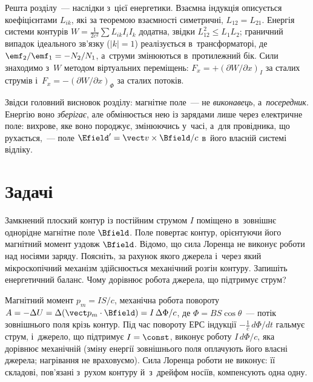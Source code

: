 Решта розділу~--- наслідки з~цієї енергетики. Взаємна індукція описується коефіцієнтами $L_{ik}$, які за теоремою взаємності симетричні, $L_{12}=L_{21}$. Енергія системи контурів $W=\frac1{2c^2}\sum L_{ik}I_iI_k$ додатна, звідки $L_{12}^2\le L_1L_2$; граничний випадок ідеального зв'язку ($|k|=1$) реалізується в~трансформаторі, де $\emf_2/\emf_1=-N_2/N_1$, а~струми змінюються в~протилежний бік. Сили знаходимо з~$W$ методом віртуальних переміщень: $F_x=+(\partial W/\partial x)_I$ за сталих струмів і~$F_x=-(\partial W/\partial x)_\Phi$ за сталих потоків.

Звідси головний висновок розділу: магнітне поле~--- не \emph{виконавець},
а~\emph{посередник}. Енергію воно \emph{зберігає}, але обмінюється нею із зарядами лише через електричне поле: вихрове, яке воно породжує, змінюючись у~часі, а~для провідника, що рухається,~--- поле $\Efield'=\vect v\times\Bfield/c$ в~його власній системі відліку.



\section*{Задачі}



 {}


\begin{problem}
	Замкнений плоский контур із постійним струмом \(I\) поміщено в~зовнішнє однорідне
	магнітне поле \(\Bfield\). Поле повертає контур, орієнтуючи його магнітний момент
	уздовж \(\Bfield\). Відомо, що сила Лоренца не виконує роботи над носіями заряду.
	Поясніть, за рахунок якого джерела і~через який мікроскопічний механізм здійснюється
	механічний розгін контуру. Запишіть енергетичний баланс. Чому дорівнює робота джерела, що підтримує струм?
	\begin{solution}
		Магнітний момент $p_m=IS/c$, механічна робота повороту $A=-\Delta U=\Delta(\vect p_m\cdot\Bfield)=I\,\Delta\Phi/c$, де $\Phi=BS\cos\theta$~--- потік зовнішнього поля крізь контур. Під час повороту ЕРС індукції $-\frac1c\,d\Phi/dt$ гальмує струм, і~джерело, що підтримує $I=\const$, виконує роботу $I\,d\Phi/c$, яка дорівнює механічній (зміну енергії зовнішнього поля оплачують його власні джерела; нагрівання не враховуємо). Сила Лоренца роботи не виконує: її складові, пов'язані з~рухом контуру й~з~дрейфом носіїв, компенсують одна одну.
	\end{solution}
\end{problem}

